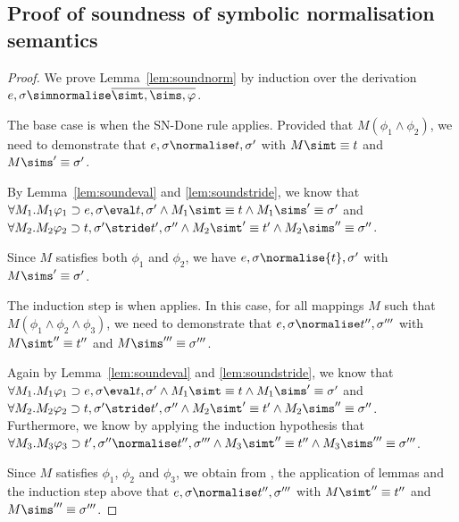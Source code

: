 \subsection{Proof of soundness of symbolic normalisation semantics}
\begin{proof}
  We prove Lemma~\ref{lem:soundnorm} by induction over the derivation $e,\sigma\simnormalise \overline{\simt,\sims,\phi}$.

  The base case is when the SN-Done rule applies.
  Provided that $M(\phi_1\land \phi_2)$,
  we need to demonstrate that
  $e,\sigma\normalise t,\sigma'$ with
  $M \simt\equiv {t}$ and $M\sims'\equiv {\sigma'}$.

  By Lemma~\ref{lem:soundeval} and \ref{lem:soundstride}, we know that\\
  $\forall M_1. M_1\phi_1 \implies e,\sigma {\eval}{t},{\sigma'}\land M_1 \simt \equiv {t} \land M_1 \sims'\equiv {\sigma'}$ and\\
  $\forall M_2.M_2\phi_2\implies t,\sigma'{\stride}{t'},{\sigma''}\land M_2 \simt'\equiv{t'}\land M_2\sims''\equiv {\sigma''}$.

  Since $M$ satisfies both $\phi_1$ and $\phi_2$, we have $e,\sigma \normalise {t},{\sigma'}$ with $M\sims'\equiv {\sigma'}$.

  The induction step is when  applies.
  In this case, for all mappings $M$ such that
  $M(\phi_1\land \phi_2 \land \phi_3)$,
  we need to demonstrate that $e,\sigma\normalise t'',\sigma'''$
  with $M \simt''\equiv {t''}$ and $M\sims'''\equiv {\sigma'''}$.

  Again by Lemma~\ref{lem:soundeval} and \ref{lem:soundstride}, we know that\\
  $\forall M_1. M_1\phi_1 \implies e,\sigma {\eval}{t},{\sigma'}\land M_1 \simt \equiv {t} \land M_1 \sims'\equiv {\sigma'}$ and\\
  $\forall M_2.M_2\phi_2\implies t,\sigma'{\stride}{t'},{\sigma''}\land M_2 \simt'\equiv{t'}\land M_2\sims''\equiv {\sigma''}$.\\
  Furthermore, we know by applying the induction hypothesis that\\
  $\forall M_3.M_3\phi_3 \implies t',\sigma''{\normalise} {t''},{\sigma'''}\land M_3 \simt''\equiv {t''}\land M_3 \sims'''\equiv {\sigma'''}$.

  Since $M$ satisfies $\phi_1$, $\phi_2$ and $\phi_3$,
  we obtain from , the application of lemmas and the induction step above that $e,\sigma\normalise t'',\sigma'''$
  with $M \simt''\equiv {t''}$ and $M\sims'''\equiv {\sigma'''}$.
\end{proof}

